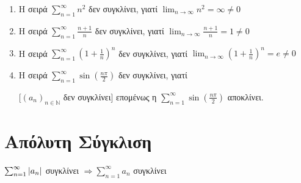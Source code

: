 \documentclass[a4paper,table]{report}
\begin{document}
\begin{examples}
    \begin{enumerate}
        \item Η σειρά $ \sum_{n=1}^{\infty} n^{2} $ δεν συγκλίνει, γιατί 
            $ \lim_{n \to \infty} n^{2} = \infty \neq 0$
        \item Η σειρά $ \sum_{n=1}^{\infty} \frac{n+1}{n} $ δεν συγκλίνει, γιατί 
            $ \lim_{n \to \infty} \frac{n+1}{n} = 1 \neq 0 $
        \item Η σειρά $ \sum_{n=1}^{\infty} (1 + \frac{1}{n} )^{n} $ δεν συγκλίνει, 
            γιατί $ \lim_{n \to \infty} (1+ \frac{1}{n} )^{n} = e \neq 0 $
        \item Η σειρά $ \sum_{n=1}^{\infty} \sin{\left(\frac{n \pi}{2}\right)} $ 
            δεν συγκλίνει, γιατί 

            \begin{minipage}{0.55\textwidth}
            \end{minipage}

            [$ {(a_{n})}_{n \in \mathbb{N}} $ δεν συγκλίνει]
            επομένως η $ \sum_{n=1}^{\infty} \sin{\left(\frac{n \pi}{2}\right) } $ 
            αποκλίνει.
    \end{enumerate}
\end{examples}

\section{Απόλυτη Σύγκλιση}

\begin{mybox3}
\begin{prop}
    $ \sum_{n=1}^{\infty} \abs{a_{n}} $ συγκλίνει 
    $ \Rightarrow \sum_{n=1}^{\infty} a_{n} $ συγκλίνει 
  \end{prop}
\end{mybox3}
\end{document}
